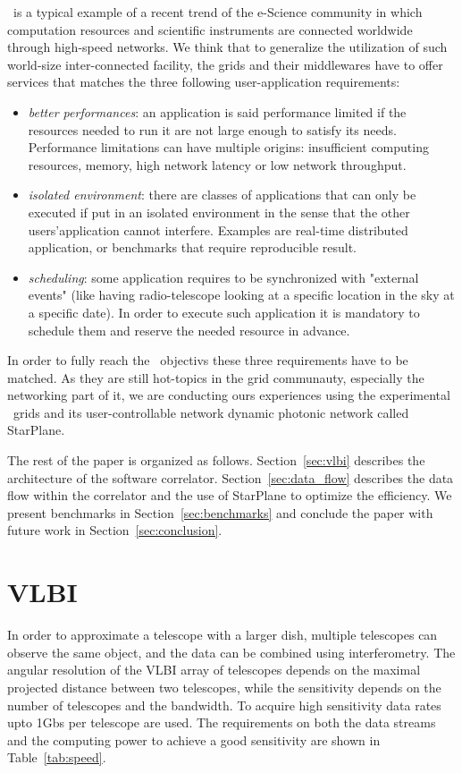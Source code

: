 \scarie\ is a typical example of a recent trend of the e-Science 
community in which computation resources and scientific instruments 
are connected worldwide through high-speed networks. We think that to 
generalize the utilization of such world-size inter-connected facility, 
the grids and their middlewares have to offer services that matches the three
following user-application requirements:
\begin{itemize}
\item \emph{better performances}: an application is said performance
  limited if the resources needed to run it are not large enough to
  satisfy its needs. Performance limitations can have multiple
  origins: insufficient computing resources, memory, high network
  latency or low network throughput.
  
\item \emph{isolated environment}: there are classes of applications
  that can only be executed if put in an isolated environment in the 
  sense that the other users'application cannot interfere. Examples are 
  real-time distributed application, or benchmarks that require reproducible
  result.

\item \emph{scheduling}: some application requires to be synchronized
  with "external events" (like having radio-telescope looking at a
  specific location in the sky at a specific date). In order to
  execute such application it is mandatory to schedule them and
  reserve the needed resource in advance.
\end{itemize}

In order to fully reach the \scarie\ objectivs these three requirements 
have to be matched. As they are still hot-topics in the grid 
communauty, especially the networking part of it, we are 
conducting ours experiences using the experimental
 \ grids and its user-controllable network dynamic 
photonic network called StarPlane. 

The rest of the paper is organized as follows. Section~\ref{sec:vlbi}
describes the architecture of the software correlator.
Section~\ref{sec:data_flow} describes the data flow within the
correlator and the use of StarPlane to optimize the efficiency. We
present benchmarks in Section~\ref{sec:benchmarks} and conclude the
paper with future work in Section~\ref{sec:conclusion}.


\section{VLBI}
In order to approximate a telescope with a larger dish, multiple
telescopes can observe the same object, and the data can be combined
using interferometry. The angular resolution of the VLBI array of
telescopes depends on the maximal projected distance between two
telescopes, while the sensitivity depends on the number of telescopes
and the bandwidth. To acquire high sensitivity data rates upto 1Gbs
per telescope are used.  The requirements on both the data streams and
the computing power to achieve a good sensitivity are shown in
Table~\ref{tab:speed}.


